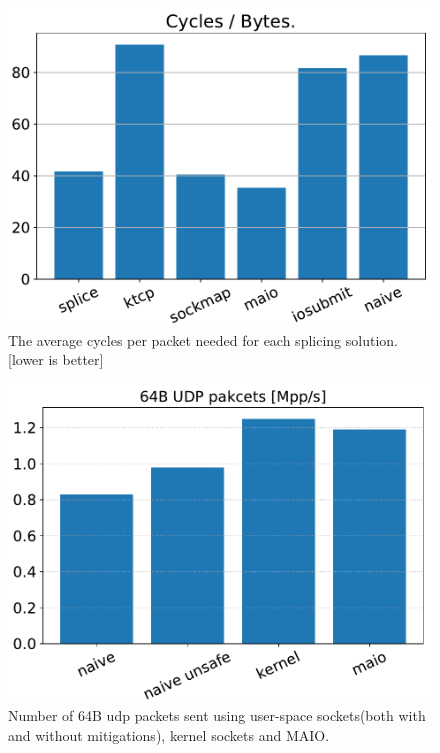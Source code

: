 \begin{figure}[t]
    \centering
    \includegraphics[width=\columnwidth]{splice.pdf}
    \caption{The average cycles per packet needed for each splicing solution. [lower is better]}
    \label{fig:cyc_byte}
\end{figure}
\begin{figure}[t]
    \centering
    \includegraphics[width=\columnwidth]{syscall.pdf}
    \caption{Number of 64B udp packets sent using user-space sockets(both with and without mitigations), kernel sockets and MAIO.} 
    \label{fig:pps}
\end{figure}
